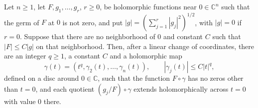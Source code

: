 \begin{lemma}\label{lem:bounded-domination-curve}
Let $n\geq1$, let $F,g_1,\ldots,g_r$, $r\geq0$, be holomorphic functions near $0\in\mathbb C^n$ such that the germ of $F$ at $0$ is not zero, and put $|g|=(\sum_{j=1}^r|g_j|^2)^{1/2}$, with $|g|=0$ if $r=0$. Suppose that there are no neighborhood of $0$ and constant $C$ such that $|F|\leq C|g|$ on that neighborhood. Then, after a linear change of coordinates, there are an integer $q\geq1$, a constant $C$ and a holomorphic map
\[
 \gamma(t)=(t^q,\gamma_2(t),\ldots,\gamma_n(t)),\qquad
 |\gamma_j(t)|\leq C|t|^q,
\]
defined on a disc around $0\in\mathbb C$, such that the function $F\circ\gamma$ has no zeros other than $t=0$, and each quotient $(g_j/F)\circ\gamma$ extends holomorphically across $t=0$ with value $0$ there.
\end{lemma}

